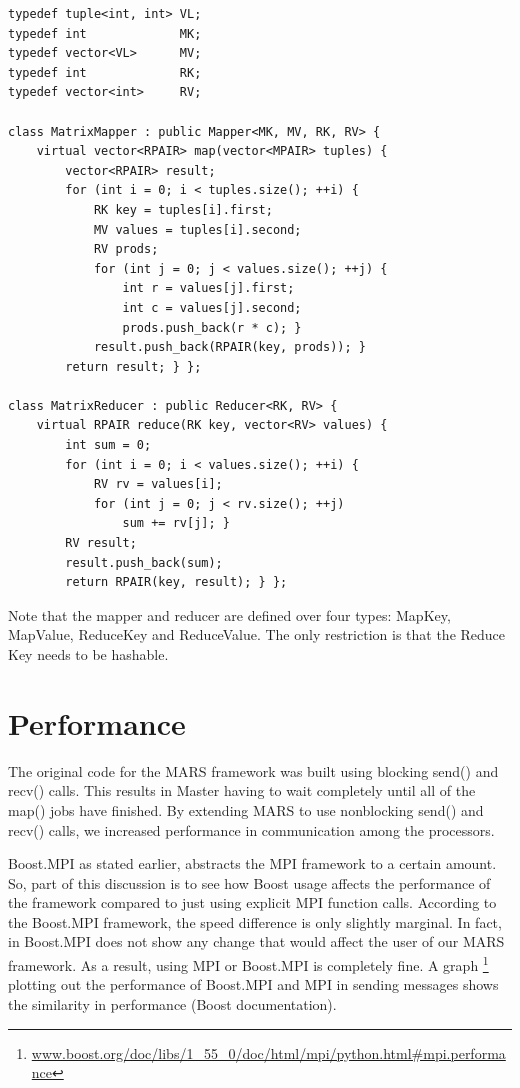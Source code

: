 \documentclass[11pt]{article}
\begin{document}
\begin{verbatim}
typedef tuple<int, int> VL;
typedef int             MK;
typedef vector<VL>      MV;
typedef int             RK;
typedef vector<int>     RV;

class MatrixMapper : public Mapper<MK, MV, RK, RV> {
    virtual vector<RPAIR> map(vector<MPAIR> tuples) {
        vector<RPAIR> result;
        for (int i = 0; i < tuples.size(); ++i) {
            RK key = tuples[i].first;
            MV values = tuples[i].second;
            RV prods;
            for (int j = 0; j < values.size(); ++j) {
                int r = values[j].first;
                int c = values[j].second;
                prods.push_back(r * c); }
            result.push_back(RPAIR(key, prods)); }
        return result; } };

class MatrixReducer : public Reducer<RK, RV> {
    virtual RPAIR reduce(RK key, vector<RV> values) {
        int sum = 0;
        for (int i = 0; i < values.size(); ++i) {
            RV rv = values[i];
            for (int j = 0; j < rv.size(); ++j)
                sum += rv[j]; }
        RV result;
        result.push_back(sum);
        return RPAIR(key, result); } };
\end{verbatim}
Note that the mapper and reducer are defined over four types: MapKey, MapValue, ReduceKey and ReduceValue. The only restriction is that the Reduce Key needs to be hashable.

\section{Performance}
The original code for the MARS framework was built using blocking send() and recv() calls. This results in Master having to wait completely until all of the map() jobs have finished. By extending MARS to use nonblocking send() and recv() calls, we increased performance in communication among the processors.

Boost.MPI as stated earlier, abstracts the MPI framework to a certain amount. So, part of this discussion is to see how Boost usage affects the performance of the framework compared to just using explicit MPI function calls. According to the Boost.MPI framework, the speed difference is only slightly marginal. In fact, in Boost.MPI does not show any change that would affect the user of our MARS framework. As a result, using MPI or Boost.MPI is completely fine. A graph \footnote{\url{www.boost.org/doc/libs/1_55_0/doc/html/mpi/python.html\#mpi.performance}} plotting out the performance of Boost.MPI and MPI in sending messages shows the similarity in performance (Boost documentation).
\end{document}
